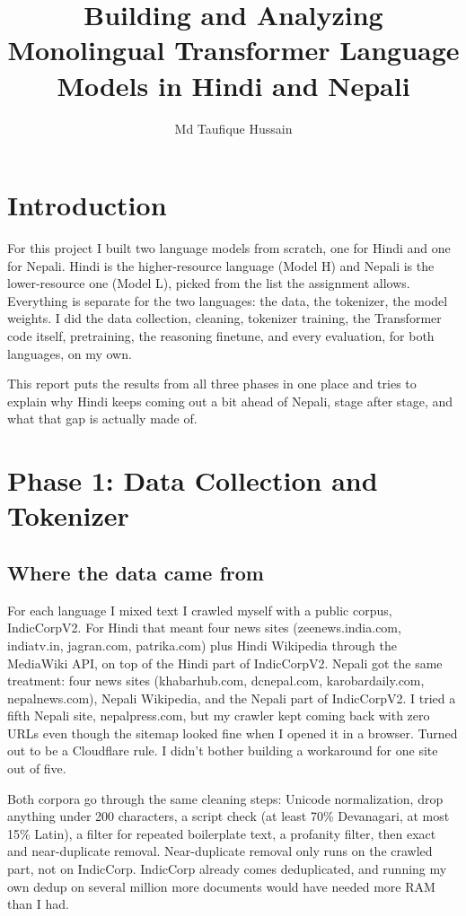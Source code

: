 \documentclass[10pt]{article}
\title{\vspace{-1.5em}Building and Analyzing Monolingual Transformer Language Models in Hindi and Nepali}
\author{Md Taufique Hussain}
\date{}
\begin{document}
\maketitle
\vspace{-2em}

\section*{Introduction}

For this project I built two language models from scratch, one for Hindi and one for Nepali. Hindi is the higher-resource language (Model H) and Nepali is the lower-resource one (Model L), picked from the list the assignment allows. Everything is separate for the two languages: the data, the tokenizer, the model weights. I did the data collection, cleaning, tokenizer training, the Transformer code itself, pretraining, the reasoning finetune, and every evaluation, for both languages, on my own.

This report puts the results from all three phases in one place and tries to explain why Hindi keeps coming out a bit ahead of Nepali, stage after stage, and what that gap is actually made of.

\section{Phase 1: Data Collection and Tokenizer}

\subsection{Where the data came from}

For each language I mixed text I crawled myself with a public corpus, IndicCorpV2. For Hindi that meant four news sites (zeenews.india.com, indiatv.in, jagran.com, patrika.com) plus Hindi Wikipedia through the MediaWiki API, on top of the Hindi part of IndicCorpV2. Nepali got the same treatment: four news sites (khabarhub.com, dcnepal.com, karobardaily.com, nepalnews.com), Nepali Wikipedia, and the Nepali part of IndicCorpV2. I tried a fifth Nepali site, nepalpress.com, but my crawler kept coming back with zero URLs even though the sitemap looked fine when I opened it in a browser. Turned out to be a Cloudflare rule. I didn't bother building a workaround for one site out of five.

Both corpora go through the same cleaning steps: Unicode normalization, drop anything under 200 characters, a script check (at least 70\% Devanagari, at most 15\% Latin), a filter for repeated boilerplate text, a profanity filter, then exact and near-duplicate removal. Near-duplicate removal only runs on the crawled part, not on IndicCorp. IndicCorp already comes deduplicated, and running my own dedup on several million more documents would have needed more RAM than I had.
\end{document}
